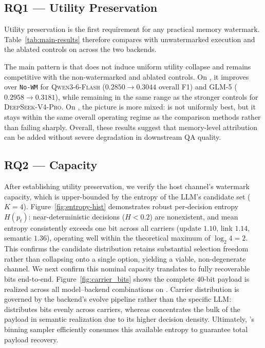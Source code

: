 \subsection{RQ1 — Utility Preservation}
\label{sec:rq1}
Utility preservation is the first requirement for any practical memory
watermark. Table~\ref{tab:main-results} therefore compares \memmark{}
with unwatermarked execution and the ablated controls on \locomo{}
across the two backends.

The main pattern is that \memmark{} does not induce uniform utility
collapse and remains competitive with the non-watermarked and ablated
controls. On \amem{}, it improves over \texttt{No-WM} for
\textsc{Qwen3-6-Flash} ($0.2850 \rightarrow 0.3044$ overall F1) and
\textsc{GLM-5} ($0.2958 \rightarrow 0.3181$), while remaining in the
same range as the stronger controls for \textsc{DeepSeek-V4-Pro}. On
\graphiti{}, the picture is more mixed: \memmark{} is not uniformly
best, but it stays within the same overall operating regime as the
comparison methods rather than failing sharply. Overall, these
results suggest that memory-level attribution can be added without
severe degradation in downstream QA quality.



\subsection{RQ2 — Capacity}
\label{sec:rq2}

After establishing utility preservation, we verify the host channel's watermark capacity, which is upper-bounded by the entropy of the LLM's candidate set ($K{=}4$). Figure~\ref{fig:entropy-hist} demonstrates robust per-decision entropy $H(p_t)$: near-deterministic decisions ($H{<}0.2$) are nonexistent, and mean entropy consistently exceeds one bit across all carriers (update $1.10$, link $1.14$, semantic $1.36$), operating well within the theoretical maximum of $\log_2 4 = 2$. This confirms the candidate distribution retains substantial selection freedom rather than collapsing onto a single option, yielding a viable, non-degenerate channel. We next confirm this nominal capacity translates to fully recoverable bits end-to-end. Figure~\ref{fig:carrier_bits} shows the complete $40$-bit payload is realized across all model--backend combinations on \locomo{}. Carrier distribution is governed by the backend's evolve pipeline rather than the specific LLM: \amem{} distributes bits evenly across carriers, whereas \graphiti{} concentrates the bulk of the payload in semantic realization due to its higher decision density. Ultimately, \memmark{}'s binning sampler efficiently consumes this available entropy to guarantee total payload recovery.


